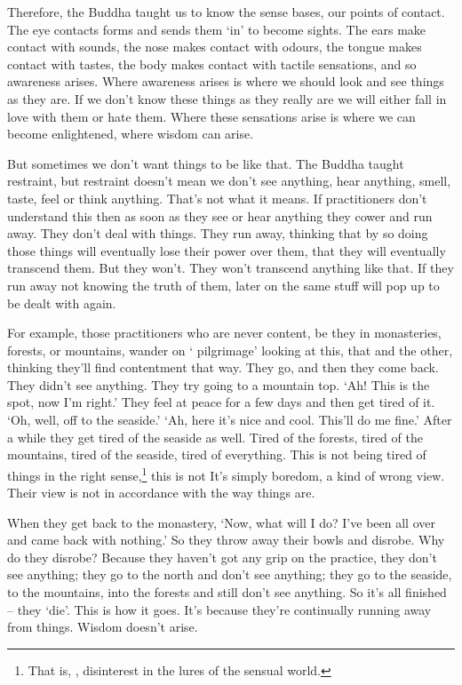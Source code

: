 Therefore, the Buddha taught us to know the sense bases, our points of contact. The eye contacts forms and sends them `in' to become sights. The ears make contact with sounds, the nose makes contact with odours, the tongue makes contact with tastes, the body makes contact with tactile sensations, and so awareness arises. Where awareness arises is where we should look and see things as they are. If we don't know these things as they really are we will either fall in love with them or hate them. Where these sensations arise is where we can become enlightened, where wisdom can arise.

But sometimes we don't want things to be like that. The Buddha taught restraint, but restraint doesn't mean we don't see anything, hear anything, smell, taste, feel or think anything. That's not what it means. If practitioners don't understand this then as soon as they see or hear anything they cower and run away. They don't deal with things. They run away, thinking that by so doing those things will eventually lose their power over them, that they will eventually transcend them. But they won't. They won't transcend anything like that. If they run away not knowing the truth of them, later on the same stuff will pop up to be dealt with again.

For example, those practitioners who are never content, be they in monasteries, forests, or mountains, wander on ` pilgrimage' looking at this, that and the other, thinking they'll find contentment that way. They go, and then they come back. They didn't see anything. They try going to a mountain top. `Ah! This is the spot, now I'm right.' They feel at peace for a few days and then get tired of it. `Oh, well, off to the seaside.' `Ah, here it's nice and cool. This'll do me fine.' After a while they get tired of the seaside as well. Tired of the forests, tired of the mountains, tired of the seaside, tired of everything. This is not being tired of things in the right sense,\footnote{That is, , disinterest in the lures of the sensual world.} this is not  It's simply boredom, a kind of wrong view. Their view is not in accordance with the way things are.

When they get back to the monastery, `Now, what will I do? I've been all over and came back with nothing.' So they throw away their bowls and disrobe. Why do they disrobe? Because they haven't got any grip on the practice, they don't see anything; they go to the north and don't see anything; they go to the seaside, to the mountains, into the forests and still don't see anything. So it's all finished -- they `die'. This is how it goes. It's because they're continually running away from things. Wisdom doesn't arise.


